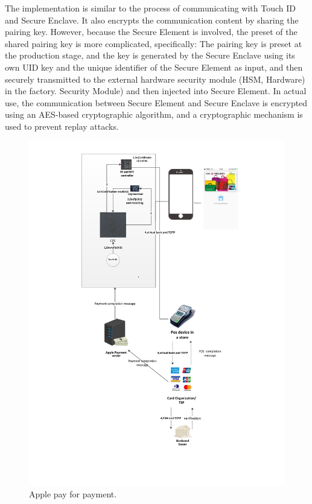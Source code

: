 \documentclass[journal]{IEEEtran}
\begin{document}
The implementation is similar to the process of communicating with Touch ID and Secure Enclave. It also encrypts the communication content by sharing the pairing key. However, because the Secure Element is involved, the preset of the shared pairing key is more complicated, specifically: The pairing key is preset at the production stage, and the key is generated by the Secure Enclave using its own UID key and the unique identifier of the Secure Element as input, and then securely transmitted to the external hardware security module (HSM, Hardware) in the factory. Security Module) and then injected into Secure Element. In actual use, the communication between Secure Element and Secure Enclave is encrypted using an AES-based cryptographic algorithm, and a cryptographic mechanism is used to prevent replay attacks.


\begin{figure}[htbp]
\centerline{\includegraphics[scale=0.7]{iphone_pay.pdf}}
\caption{Apple pay for payment.}
\label{fig}
\end{figure}
    
\end{document}
